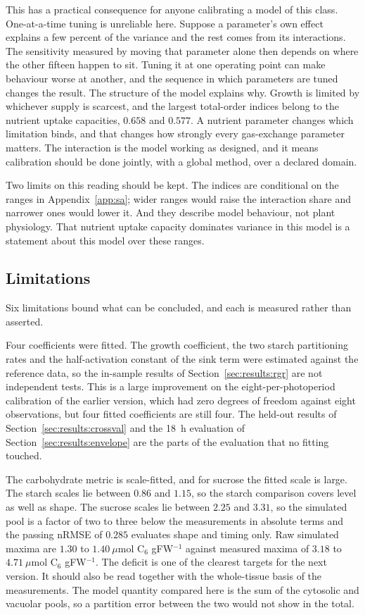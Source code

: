 This has a practical consequence for anyone calibrating a model of this class.
One-at-a-time tuning is unreliable here. Suppose a parameter's own effect explains a few percent of the variance and the
rest comes from its interactions. The sensitivity measured by moving that
parameter alone then depends on where the other fifteen happen to sit. Tuning it at one operating point can make behaviour
worse at another, and the sequence in which parameters are tuned changes the
result. The structure of the model explains why. Growth is limited by whichever
supply is scarcest, and the largest total-order indices belong to the nutrient
uptake capacities, $0.658$ and $0.577$. A nutrient parameter changes which
limitation binds, and that changes how strongly every gas-exchange parameter
matters. The interaction is the model working as designed, and it means
calibration should be done jointly, with a global method, over a declared
domain.

Two limits on this reading should be kept. The indices are conditional on the
ranges in Appendix~\ref{app:sa}; wider ranges would raise the interaction share
and narrower ones would lower it. And they describe model behaviour, not plant
physiology. That nutrient uptake capacity dominates variance in this model is a
statement about this model over these ranges.

\subsection{Limitations}
\label{sec:limitations}

Six limitations bound what can be concluded, and each is measured rather than
asserted.

Four coefficients were fitted. The growth coefficient, the two starch
partitioning rates and the half-activation constant of the sink term were
estimated against the reference data, so the in-sample results of
Section~\ref{sec:results:rgr} are not independent tests. This is a large
improvement on the eight-per-photoperiod calibration of the earlier version,
which had zero degrees of freedom against eight observations, but four fitted
coefficients are still four. The held-out results of
Section~\ref{sec:results:crossval} and the 18~h evaluation of
Section~\ref{sec:results:envelope} are the parts of the evaluation that no
fitting touched.

The carbohydrate metric is scale-fitted, and for sucrose the fitted scale is
large. The starch scales lie between $0.86$ and $1.15$, so the starch
comparison covers level as well as shape. The sucrose scales lie between $2.25$
and $3.31$, so the simulated pool is a factor of two to three below the
measurements in absolute terms and the passing nRMSE of $0.285$ evaluates shape
and timing only. Raw simulated maxima are $1.30$ to $1.40~\mu\mathrm{mol}$
C$_6$ gFW$^{-1}$ against measured maxima of $3.18$ to
$4.71~\mu\mathrm{mol}$ C$_6$ gFW$^{-1}$. The deficit is one of the clearest
targets for the next version. It should also be read together with the
whole-tissue basis of the measurements. The model quantity compared here is the
sum of the cytosolic and vacuolar pools, so a partition error between the two
would not show in the total.

